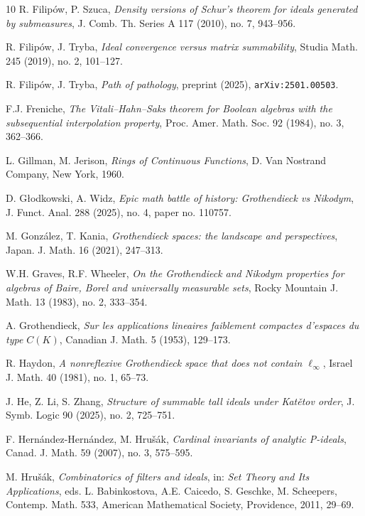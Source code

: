 \documentclass[a4paper,11pt,fleqn]{amsart}
\theoremstyle{definition}
\theoremstyle{remark}
\numberwithin{equation}{section}
\begin{document}
\begin{thebibliography}{10}
 R. Filip\'{o}w, P. Szuca, \textit{Density versions of Schur's theorem for ideals generated by submeasures}, J. Comb. Th. Series A 117 (2010), no. 7, 943--956.

 R. Filip\'{o}w, J. Tryba, \textit{Ideal convergence versus matrix summability}, Studia Math. 245 (2019), no. 2, 101--127.

 R. Filip\'{o}w, J. Tryba, \textit{Path of pathology}, preprint (2025), \texttt{arXiv:2501.00503}.

 F.J. Freniche, \textit{The Vitali--Hahn--Saks theorem for Boolean algebras with the subsequential interpolation property}, Proc. Amer. Math. Soc. 92 (1984), no. 3, 362--366.

 L. Gillman, M. Jerison, \textit{Rings of Continuous Functions}, D. Van Nostrand Company, New York, 1960.

 D. G\l odkowski, A. Widz, \textit{Epic math battle of history: Grothendieck vs Nikodym}, J. Funct. Anal. 288 (2025), no. 4, paper no. 110757.

 M. Gonz\'alez, T. Kania, \textit{Grothendieck spaces: the landscape and perspectives}, Japan. J. Math. 16 (2021), 247--313.

 W.H. Graves, R.F. Wheeler, \textit{On the Grothendieck and Nikodym properties for algebras of Baire, Borel and
universally measurable sets}, Rocky Mountain J. Math. 13 (1983), no. 2, 333--354.

 A. Grothendieck, \textit{Sur les applications lineaires faiblement compactes d'espaces du type $C(K)$}, Canadian J. Math. 5 (1953), 129--173.

 R. Haydon, \textit{A nonreflexive Grothendieck space that does not contain $\ell_\infty$}, Israel J. Math. 40 (1981), no. 1, 65--73.

 J. He, Z. Li, S. Zhang, \textit{Structure of summable tall ideals under Kat\v{e}tov order}, J. Symb. Logic 90 (2025), no. 2, 725--751.

 F. Hern\'{a}ndez-Hern\'{a}ndez, M. Hru\v{s}\'{a}k, \textit{Cardinal invariants of analytic P-ideals}, Canad. J. Math. 59 (2007), no. 3, 575--595.

 M. Hru\v{s}\'ak, \textit{Combinatorics of filters and ideals}, in: \textit{Set Theory and Its Applications}, eds. L. Babinkostova, A.E. Caicedo, S. Geschke, M. Scheepers, Contemp. Math. 533, American Mathematical Society, Providence, 2011, 29--69.


\end{thebibliography}
\end{document}
